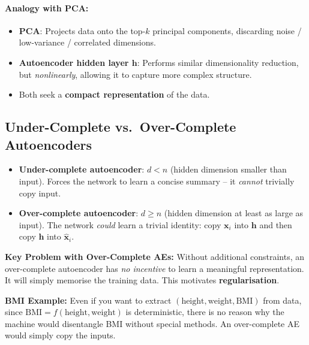 \documentclass[12pt,a4paper]{article}
\newcommand{\vx}{\mathbf{x}}
\newcommand{\vh}{\mathbf{h}}
\newcommand{\hatx}{\hat{\mathbf{x}}}
\begin{document}
\paragraph{Analogy with PCA:}
\begin{itemize}
  \item \textbf{PCA}: Projects data onto the top-$k$ principal components, discarding noise / low-variance / correlated dimensions.
  \item \textbf{Autoencoder hidden layer $\vh$}: Performs similar dimensionality reduction, but \emph{nonlinearly}, allowing it to capture more complex structure.
  \item Both seek a \textbf{compact representation} of the data.
\end{itemize}

\subsection{Under-Complete vs.\ Over-Complete Autoencoders}

\begin{definitionbox}
\begin{itemize}
  \item \textbf{Under-complete autoencoder}: $d < n$ (hidden dimension smaller than input). Forces the network to learn a concise summary -- it \emph{cannot} trivially copy input.
  \item \textbf{Over-complete autoencoder}: $d \geq n$ (hidden dimension at least as large as input). The network \emph{could} learn a trivial identity: copy $\vx_i$ into $\vh$ and then copy $\vh$ into $\hatx_i$.
\end{itemize}
\end{definitionbox}

\begin{alertbox}
\textbf{Key Problem with Over-Complete AEs:} Without additional constraints, an over-complete autoencoder has \emph{no incentive} to learn a meaningful representation. It will simply memorise the training data. This motivates \textbf{regularisation}.
\end{alertbox}

\begin{notebox}
\textbf{BMI Example:} Even if you want to extract $(\text{height}, \text{weight}, \text{BMI})$ from data, since $\text{BMI} = f(\text{height}, \text{weight})$ is deterministic, there is no reason why the machine would disentangle BMI without special methods. An over-complete AE would simply copy the inputs.
\end{notebox}
\end{document}
